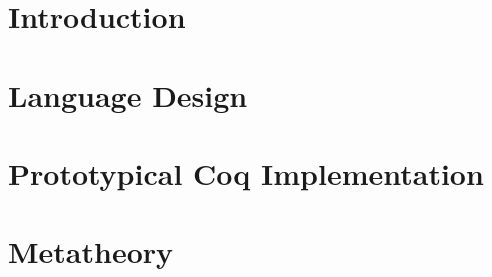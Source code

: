 \begin{abstract}

\end{abstract}

\maketitle

\section{Introduction}
\label{sec:intro}



\section{Language Design}
\label{sec:lang-design}





\newcommand{\denotes}[1]{{\llbracket {#1} \rrbracket}}
\newcommand{\denotesS}[1]{{{\llbracket {#1} \rrbracket}_S}}
\newcommand{\goodCtx}[2]{{ {#1} \ \vdash }}
\newcommand{\goodType}[3]{{ {#1} \vdash {#2} }}
\newcommand{\goodTerm}[3]{{ {#1} \vdash {#2} : {#3} }}
\newcommand{\goodSub}[3]{{ {#1} \vdash {#2} : {#3} }}
\newcommand{\goodSig}[3]{{ {#1} \vdash {#2} \ \  Sig^{#3} }}
\newcommand{\goodWSig}[3]{{ {#1} \vdash {#2} \ \ WSig^{#3} }}
\newcommand{\goodSeal}[4]{{ {#1} \vdash {#2} : {#3} \  |\  {#4} }}
\newcommand{\goodInh}[4]{{ {#1} \vdash {#2} : {#3} \twoheadrightarrow {#4}}}
\newcommand{\nat}{\mathbf{N}}

\newcommand{\cU}{{\mathcal{U}}}
\newcommand{\cB}{{\mathbb{B}}}
\newcommand{\cL}{{\mathcal{L}}}
\newcommand{\cC}{{\mathcal{C}}}
\newcommand{\cCt}{{\mathcal{C}_t}}
\newcommand{\bW}{{\mathbb{W}}}

\section{Prototypical Coq Implementation}
\label{sec:coqimpl}


\section{Metatheory}

